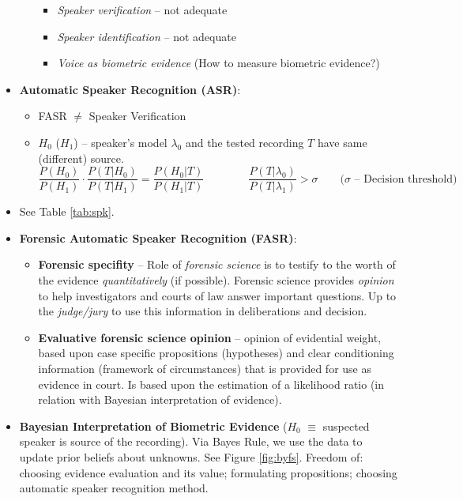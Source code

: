 \documentclass[a4paper]{article}
\begin{document}
\begin{itemize}
\begin{itemize}
          \begin{itemize}
            \item \emph{Speaker verification} -- not adequate
            \item \emph{Speaker identification} -- not adequate
            \item \emph{Voice as biometric evidence} (How to measure biometric evidence?)
          \end{itemize}
        \end{itemize}
        \item \textbf{Automatic Speaker Recognition (ASR)}:
        \begin{itemize}
          \item FASR $\neq$ Speaker Verification
          \item $H_0$ ($H_1$) -- speaker's model $\lambda_0$ and the tested recording $T$ have same (different) source.
          $$\frac{P(H_0)}{P(H_1)}\cdot\frac{P(T|H_0)}{P(T|H_1)}=\frac{P(H_0|T)}{P(H_1|T)}\qquad\qquad\frac{P(T|\lambda_0)}{P(T|\lambda_1)}>\sigma\qquad\text{($\sigma$ -- Decision threshold)}$$
        \end{itemize}
        \item See Table \ref{tab:spk}.
        \item \textbf{Forensic Automatic Speaker Recognition (FASR)}:
        \begin{itemize}
          \item \textbf{Forensic specifity} -- Role of \emph{forensic science} is to testify to the worth of the evidence \emph{quantitatively} (if possible). Forensic science provides \emph{opinion} to help investigators and courts of law answer important questions. Up to the \emph{judge/jury} to use this information in deliberations and decision.
          \item \textbf{Evaluative forensic science opinion} -- opinion of evidential weight, based upon case specific propositions (hypotheses) and clear conditioning information (framework of circumstances) that is provided for use as evidence in court. Is based upon the estimation of a likelihood ratio (in relation with Bayesian interpretation of evidence).
        \end{itemize}
        \item \textbf{Bayesian Interpretation of Biometric Evidence} ($H_0$ $\equiv$ suspected speaker is source of the recording). Via Bayes Rule, we use the data to update prior beliefs about unknowns. See Figure \ref{fig:byfs}. Freedom of: choosing evidence evaluation and its value; formulating propositions; choosing automatic speaker recognition method.

\end{itemize}
\end{document}
